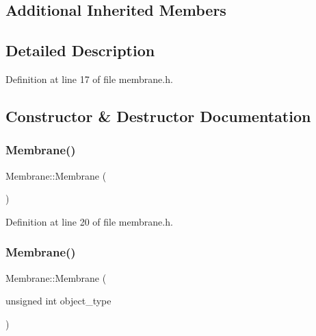 \subsection*{Additional Inherited Members}


\subsection{Detailed Description}


Definition at line 17 of file membrane.\+h.



\subsection{Constructor \& Destructor Documentation}
\mbox{\label{class_membrane_ae3db1e55d9a535226bfd41c2a9ac1f0c}} 
\subsubsection{\texorpdfstring{Membrane()}{Membrane()}\hspace{0.1cm}{\footnotesize\ttfamily [1/4]}}
{\footnotesize\ttfamily Membrane\+::\+Membrane (\begin{DoxyParamCaption}{ }\end{DoxyParamCaption})\hspace{0.3cm}{\ttfamily [inline]}}



Definition at line 20 of file membrane.\+h.

\mbox{\label{class_membrane_a9e45fcb5a4e791f2697fce4d9fa78a3f}} 
\subsubsection{\texorpdfstring{Membrane()}{Membrane()}\hspace{0.1cm}{\footnotesize\ttfamily [2/4]}}
{\footnotesize\ttfamily Membrane\+::\+Membrane (\begin{DoxyParamCaption}\item[{unsigned int}]{object\+\_\+type }\end{DoxyParamCaption})\hspace{0.3cm}{\ttfamily [inline]}}




